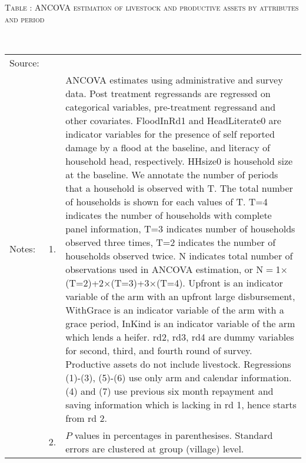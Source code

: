 \hspace{-1cm}\begin{minipage}[t]{14cm}
\hfil\textsc{\normalsize Table \thetable: ANCOVA estimation of livestock and productive assets by attributes and period\label{tab ANCOVA productive assets timevarying attributes}}\\
\setlength{\tabcolsep}{1pt}
\setlength{\baselineskip}{8pt}
\renewcommand{\arraystretch}{.55}
\hfil{}\\
\renewcommand{\arraystretch}{.8}
\setlength{\tabcolsep}{1pt}
\begin{tabular}{>{\hfill\scriptsize}p{1cm}<{}>{\hfill\scriptsize}p{.25cm}<{}>{\scriptsize}p{12cm}<{\hfill}}
Source:& \multicolumn{2}{l}{\scriptsize Estimated with GUK administrative and survey data.}\\
Notes: & 1. & ANCOVA estimates using administrative and survey data. Post treatment regressands are regressed on categorical variables, pre-treatment regressand and other covariates. \textsf{FloodInRd1} and \textsf{HeadLiterate0} are indicator variables for the presence of self reported damage by a flood at the baseline, and literacy of household head, respectively. \textsf{HHsize0} is household size at the baseline. We annotate the number of periods that a household is observed with \textsf{T}. The total number of households is shown for each values of \textsf{T}. \textsf{T=4} indicates the number of households with complete panel information, \textsf{T=3} indicates number of households observed three times, \textsf{T=2} indicates the number of households observed twice. \textsf{N} indicates total number of observations used in ANCOVA estimation, or \textsf{N$=$1$\times$(T=2)+2$\times$(T=3)+3$\times$(T=4)}.  \textsf{Upfront} is an indicator variable of the arm with an upfront large disbursement, \textsf{WithGrace} is an indicator variable of the arm with a grace period, \textsf{InKind} is an indicator variable of the arm which lends a heifer. \textsf{rd2, rd3, rd4} are dummy variables for second, third, and fourth round of survey. Productive assets do not include livestock. Regressions (1)-(3), (5)-(6) use only arm and calendar information. (4) and (7) use previous six month repayment and saving information which is lacking in rd 1, hence starts from rd 2.\\
& 2. & $P$ values in percentages in parenthesises. Standard errors are clustered at group (village) level.
\end{tabular}
\end{minipage}


